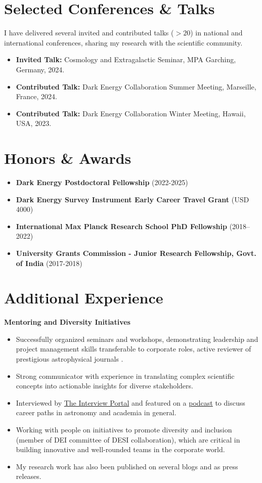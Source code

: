 \documentclass[a4paper,10pt]{article}
\begin{document}
\section*{Selected Conferences \& Talks}
I have delivered several invited and contributed talks ($>20$) in national and international conferences, sharing my research with the scientific community.
\begin{itemize}[noitemsep, topsep=0pt]
    \item \textbf{Invited Talk:} Cosmology and Extragalactic Seminar, MPA Garching, Germany, 2024.
    \item \textbf{Contributed Talk:} Dark Energy Collaboration Summer Meeting, Marseille, France, 2024.
    \item \textbf{Contributed Talk:} Dark Energy Collaboration Winter Meeting, Hawaii, USA, 2023.
\end{itemize}

\section*{Honors \& Awards}
\begin{itemize}[noitemsep, topsep=0pt]
 \item \textbf{Dark Energy Postdoctoral Fellowship} (2022-2025)
    \item \textbf{Dark Energy Survey Instrument Early Career Travel Grant} (USD 4000)
    \item \textbf{International Max Planck Research School PhD Fellowship} (2018–2022)
    \item \textbf{University Grants Commission - Junior Research Fellowship, Govt. of India} (2017-2018)
\end{itemize}

\section*{Additional Experience}
\noindent
\textbf{Mentoring and Diversity Initiatives} \\
\begin{itemize}[noitemsep, topsep=0pt]
    \item Successfully organized seminars and workshops, demonstrating leadership and project management skills transferable to corporate roles, active reviewer of prestigious astrophysical journals . 
     \item Strong communicator with experience in translating complex scientific concepts into actionable insights for diverse stakeholders.
    \item Interviewed by \href{https://theinterviewportal.com/2020/03/13/astrophysicist-interview-8/}{The Interview Portal} and featured on a \href{https://www.youtube.com/watch?v=WmA_PnYLeCg}{podcast} to discuss career paths in astronomy and academia in general.
    \item Working with people on initiatives to promote diversity and inclusion (member of DEI committee of DESI collaboration), which are critical in building innovative and well-rounded teams in the corporate world.
    \item My research work has also been published on several blogs and as press releases.
\end{itemize}
\end{document}
